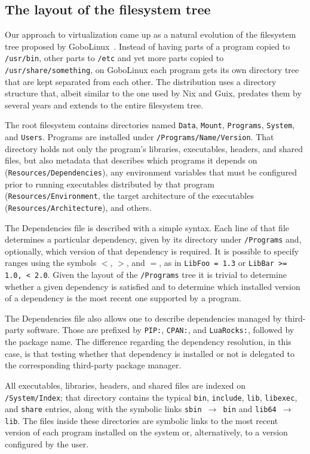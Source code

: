 \documentclass[sigplan, anonymous]{acmart}
\begin{document}
\subsection{The layout of the filesystem tree}
Our approach to virtualization came up as a natural evolution of the filesystem tree proposed
by GoboLinux~\cite{GoboLinux}. Instead of having parts of a program copied to \texttt{/usr/bin},
other parts to \texttt{/etc} and yet more parts copied to \texttt{/usr/share/something}, on
GoboLinux each program gets its own directory tree that are kept separated from each other.
The distribution uses a directory structure that, albeit similar to the one used by Nix and
Guix, predates them by several years and extends to the entire filesystem tree.

The root filesystem contains directories named \texttt{Data}, \texttt{Mount}, \texttt{Programs},
\texttt{System}, and \texttt{Users}. Programs are installed under \texttt{/Programs/Name/Version}.
That directory holds not only the program's libraries, executables, headers, and shared files, but
also metadata that describes which programs it depends on (\texttt{Resources/Dependencies}), any
environment variables that must be configured prior to running executables distributed by that
program (\texttt{Resources/Environment}, the target architecture of the executables
(\texttt{Resources/Architecture}), and others.

The Dependencies file is described with a simple syntax. Each line of that file determines
a particular dependency, given by its directory under \texttt{/Programs} and, optionally,
which version of that dependency is required. It is possible to specify ranges using the
symbols $<$, $>$, and $=$, as in \texttt{LibFoo = 1.3} or \texttt{LibBar >= 1.0, < 2.0}.
Given the layout of the \texttt{/Programs} tree it is trivial to determine whether a given
dependency is satisfied and to determine which installed version of a dependency is the most
recent one supported by a program.

The Dependencies file also allows one to describe dependencies managed by third-party
software. Those are prefixed by \texttt{PIP:}, \texttt{CPAN:}, and \texttt{LuaRocks:},
followed by the package name. The difference regarding the dependency resolution, in
this case, is that testing whether that dependency is installed or not is delegated
to the corresponding third-party package manager.

All executables, libraries, headers, and shared files are indexed on \texttt{/System/Index};
that directory contains the typical \texttt{bin}, \texttt{include}, \texttt{lib}, \texttt{libexec},
and \texttt{share} entries, along with the symbolic links \texttt{sbin $\rightarrow$ bin} and
\texttt{lib64 $\rightarrow$ lib}. The files inside these directories are symbolic links to the
most recent version of each program installed on the system or, alternatively, to a version
configured by the user.
\end{document}
